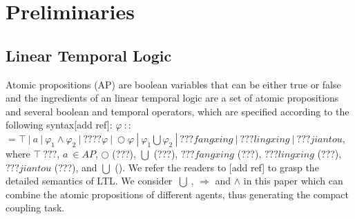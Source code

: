 \documentclass[journal]{IEEEtran}
\begin{document}
%


\section{Preliminaries}

\subsection{Linear Temporal Logic}
Atomic propositions (AP) are boolean variables that can be either true or false and the ingredients of an linear temporal logic are a set of atomic propositions and several boolean and temporal operators, which are specified according to the following syntax[add ref]: $\varphi\ $$:$$:$$=\top\ |\ a\ |\ \varphi_1\wedge\varphi_2\ |\ ????\varphi\ |\ \bigcirc\varphi\ |\ \varphi_1\bigcup\varphi_2\ |\ ???fangxing\ |\ ???lingxing\ |\ ???jiantou$, where $\top\ ???$, $a\ \in AP$, $\bigcirc$ (???), $\bigcup$ (???), $ ???fangxing$ (???),  $??? lingxing$ (???), $???jiantou$ (???), and $\bigcup$ (). We refer the readers to [add ref] to grasp the detailed semantics of LTL. We consider $\ \bigcup\ $, $\Longrightarrow$ and $\wedge$ in this paper which can combine the atomic propositions of different agents, thus generating the compact coupling task.
\end{document}
